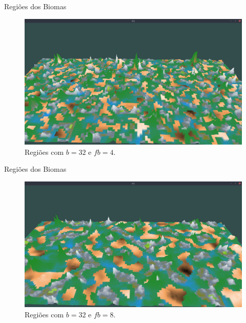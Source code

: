 \begin{frame}{Regiões dos Biomas}
    \begin{figure}[H]
        \centering
        \includegraphics[width=.9\textwidth]{img/re2bfb/fb/4b32.png}
        \caption{Regiões com $b = 32$ e $fb = 4$.}
        \label{fig:img_re2bfb_fb_4b32}
    \end{figure}
    
    
\end{frame}

\begin{frame}{Regiões dos Biomas}
    \begin{figure}[H]
        \centering
        \includegraphics[width=.9\textwidth]{img/re2bfb/fb/8b32.png}
        \caption{Regiões com $b = 32$ e $fb = 8$.}
        \label{fig:img_re2bfb_fb_8b32}
    \end{figure}
    
    
\end{frame}

